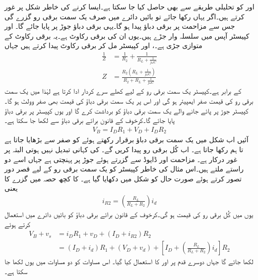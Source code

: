  اور  کو تحلیلی طریقے سے بھی حاصل کیا جا سکتا ہے۔ایسا کرنے کی خاطر شکل  پر غور کرتے ہیں۔اگر یہاں  رکھا جائے تو بائیں دائرے میں صرف یک سمت برقی رو  گزرے گی جس سے مزاحمت  پر برقی دباؤ  پیدا ہو گا۔یہی برقی دباؤ جوڑ  پر پایا جائے گا۔ اور کپیسٹر  آپس میں سلسلہ وار جڑے ہیں۔یوں ان کی برقی رکاوٹ  ہے۔یہ برقی رکاوٹ  کے متوازی جڑی ہے۔، اور کپیسٹر مل کر برقی رکاوٹ  پیدا کرتے ہیں جہاں
\begin{align}
\frac{1}{Z}&=\frac{1}{R_2}+\frac{1}{R_L+\frac{1}{j \omega C}}\\
Z&=\frac{R_2 \left(R_L+\frac{1}{j \omega C} \right)}{R_2+R_L+\frac{1}{j \omega C}}
\end{align}
کے برابر ہے۔کپیسٹر یک سمت برقی رو کے لیے کھلے سرے کردار ادا کرتا ہے لہٰذا  میں یک سمت برقی رو کی قیمت صفر ایمپیئر ہو گی اور اس پر یک سمت برقی دباؤ کی قیمت بھی صفر وولٹ ہو گا۔کپیسٹر  جوڑ  پر پائے جانے والے یک سمت برقی دباؤ کو برداشت کرے گا اور یوں کپیسٹر پر  برقی دباؤ پایا جائے گا۔کرخوف کے قانون برائے برقی دباؤ سے لکھا جا سکتا ہے۔
\begin{align} \label{مساوات_ٹرانزسٹر_یکسمتی_منبع_بار_مساوات_جزو}
V_B=I_D R_1+V_D+I_D R_2
\end{align}
آئیں اب شکل  میں یک سمت برقی دباؤ  برقرار رکھتے ہوئے  کو صفر سے بڑھایا جاتا ہے تا ہم  رکھا جاتا ہے۔ اب کُل برقی رو  پیدا کریں گے۔ کی کہانی تبدیل نہیں ہوتی البتہ  پر غور درکار ہے۔ مزاحمت  اور ڈایوڈ سے گزرتے ہوئے جوڑ  پر پہنچتی ہے جہاں اسے دو راستے ملتے ہیں۔اس مثال کی خاطر کپیسٹر کو یک سمت برقی رو کے لیے قصر دور تصور کرتے ہوئے صورت حال کو شکل میں دکھایا گیا ہے۔ کا کچھ حصہ  میں گزرے کا یعنی
\begin{align}
i_{R2}=\left(\frac{R_L}{R_L+R_2}\right) i_d
\end{align}
یوں  میں کُل برقی رو کی قیمت  ہو گی۔کرخوف کے قانون برائے برقی دباؤ کو بائیں دائرے میں استعمال کرتے ہوئے
\begin{align*}
V_B+v_s&=i_D R_1+v_D+\left(I_D+i_{R2} \right)R_2\\
&=\left(I_D+i_d \right)R_1+ \left(V_D+v_d \right)+\left[I_D+\left(\frac{R_L}{R_L+R_2}\right) i_d \right]R_2
\end{align*}
لکھا جائے گا جہاں دوسرے قدم پر  اور  کا استعمال کیا گیا۔ اس مساوات کو دو مساوات میں یوں لکھا جا سکتا ہے۔

